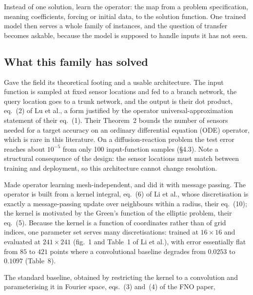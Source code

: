 \documentclass[11pt, a4paper]{article}
\begin{document}
Instead of one solution, learn the operator: the map from a problem
specification, meaning coefficients, forcing or initial data, to the solution
function. One trained model then serves a whole family of instances, and the
question of transfer becomes askable, because the model is supposed to handle
inputs it has not seen.

\subsection{What this family has solved}

\begin{description}[style=nextline]
  \item[Lu, Jin and Karniadakis, DeepONet~\citep{deeponet}]
  Gave the field its theoretical footing and a usable architecture. The input
  function is sampled at fixed sensor locations and fed to a branch network,
  the query location goes to a trunk network, and the output is their dot
  product, eq.~(2) of Lu et al., a form justified by the operator
  universal-approximation statement of their eq.~(1). Their Theorem~2 bounds
  the number of sensors needed for a target accuracy on an ordinary
  differential equation (ODE) operator, which is rare in this literature. On a diffusion-reaction problem the test error
  reaches about $10^{-5}$ from only 100 input-function samples (\S{}4.3). Note a
  structural consequence of the design: the sensor locations must match
  between training and deployment, so this architecture cannot change
  resolution.
  \item[Li et al., graph kernel networks~\citep{gkn}]
  Made operator learning mesh-independent, and did it with message passing.
  The operator is built from a kernel integral, eq.~(6) of Li et al., whose
  discretisation is exactly a message-passing update over neighbours within a
  radius, their eq.~(10); the kernel is motivated by the Green's function of
  the elliptic problem, their eq.~(5). Because the kernel is a function of
  coordinates rather than of grid indices, one parameter set serves many
  discretisations: trained at $16 \times 16$ and evaluated at $241 \times 241$
  (fig.~1 and Table~1 of Li et al.), with error essentially flat from $85$ to
  $421$ points where a convolutional baseline degrades from $0.0253$ to
  $0.1097$ (Table~8).
  \item[Li et al., Fourier neural operator, FNO~\citep{fno}]
  The standard baseline, obtained by restricting the kernel to a convolution
  and parameterising it in Fourier space, eqs.~(3) and~(4) of the FNO paper,

\end{description}
\end{document}
